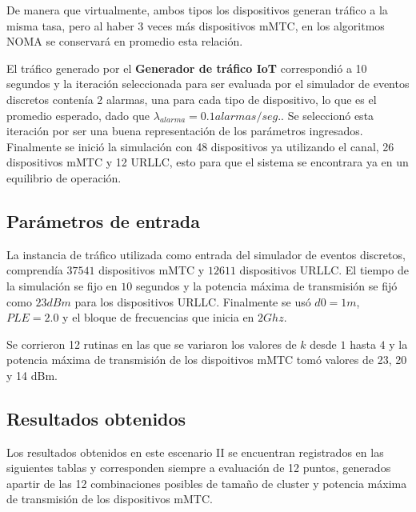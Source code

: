 De manera que virtualmente, ambos tipos los dispositivos generan tráfico a la misma tasa, pero al haber 3 veces más dispositivos mMTC, en los algoritmos NOMA se conservará en promedio esta relación.

El tráfico generado por el \textbf{Generador de tráfico IoT} correspondió a 10 segundos y la iteración seleccionada para ser evaluada por el simulador de eventos discretos contenía 2 alarmas, una para cada tipo de dispositivo, lo que es el promedio esperado, dado que $\lambda_{alarma} = 0.1 alarmas/seg.$. Se seleccionó esta iteración por ser una buena representación de los parámetros ingresados. Finalmente se inició la simulación con 48 dispositivos ya utilizando el canal, 26 dispositivos mMTC y 12 URLLC, esto para que el sistema se encontrara ya en un equilibrio de operación.

\subsection{Parámetros de entrada}

La instancia de tráfico utilizada como entrada del simulador de eventos discretos, comprendía $37541$ dispositivos mMTC y $12611$ dispositivos URLLC. El tiempo de la simulación se fijo en $10$ segundos y la potencia máxima de transmisión se fijó como $23dBm$ para los dispositivos URLLC. Finalmente se usó $d0=1m$, $PLE=2.0$ y el bloque de frecuencias que inicia en $2Ghz$. 

Se corrieron 12 rutinas en las que se variaron los valores de $k$ desde $1$ hasta $4$ y la potencia máxima de transmisión de los dispoitivos mMTC tomó valores de 23, 20 y 14 dBm.

\subsection{Resultados obtenidos}

Los resultados obtenidos en este escenario II se encuentran registrados en las siguientes tablas y corresponden siempre a evaluación de 12 puntos, generados apartir de las 12 combinaciones posibles de tamaño de cluster y potencia máxima de transmisión de los dispositivos mMTC. \newline

